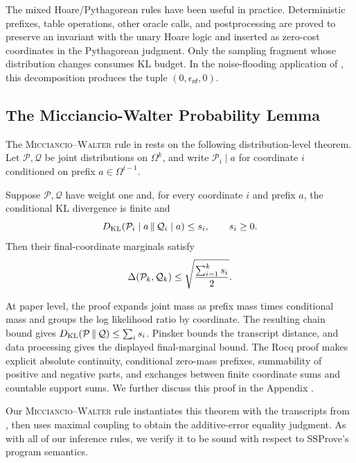 The mixed Hoare/Pythagorean rules have been useful in practice.
Deterministic prefixes, table operations, other oracle calls, and postprocessing are proved to preserve an invariant with the unary Hoare logic and inserted as zero-cost coordinates in the Pythagorean judgment.
Only the sampling fragment whose distribution changes consumes KL budget.
In the noise-flooding application of , this decomposition
produces the tuple \((0,\epsilon_{\mathsf{nf}},0)\).

\subsection{The Micciancio-Walter Probability Lemma}

The \textsc{Micciancio--Walter} rule in  rests on the
following distribution-level theorem.
Let \(\mathcal P,\mathcal Q\) be joint distributions on \(\Omega^k\), and write \(\mathcal P_i\mid a\) for coordinate \(i\) conditioned on prefix \(a\in\Omega^{i-1}\).

\begin{theorem}
\label{thm:pyth-probability}
Suppose \(\mathcal P,\mathcal Q\) have weight one and, for every coordinate
\(i\) and prefix \(a\), the conditional KL divergence is finite and
\[
 D_{\mathrm{KL}}\!\left(\mathcal P_i\mid a\,\|\,\mathcal Q_i\mid a\right)\leq s_i,
 \qquad s_i\geq0.
\]
Then their final-coordinate marginals satisfy
\[
 \Delta(\mathcal{P}_k,
      \mathcal{Q}_k)
 \leq \sqrt{\frac{\sum_{i=1}^{k}s_i}{2}}.
\]
\end{theorem}

At paper level, the proof expands joint mass as prefix mass times conditional mass and groups the log likelihood ratio by coordinate.
The resulting chain bound gives \(D_{\mathrm{KL}}\!\left(\mathcal P\,\|\,\mathcal Q\right)\leq\sum_i s_i\).
Pinsker bounds the transcript distance, and data processing gives the displayed final-marginal bound.
The Rocq proof makes explicit absolute continuity, conditional zero-mass prefixes, summability of positive and negative parts, and exchanges between finite coordinate sums and countable support sums.
We further discuss this proof in the Appendix .

Our \textsc{Micciancio--Walter} rule instantiates this theorem with the transcripts from , then uses maximal coupling to obtain the additive-error equality judgment.
As with all of our inference rules, we verify it to be sound with respect to SSProve's program semantics.


